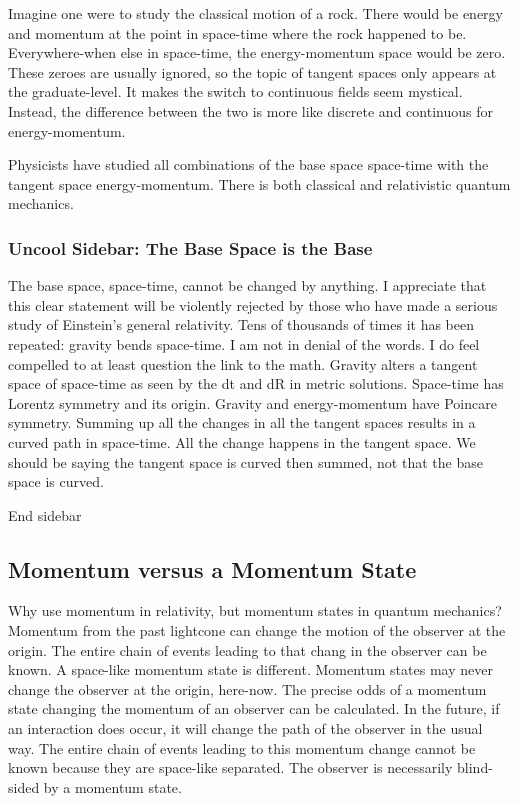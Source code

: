 Imagine one were to study the classical motion of a rock. There would be
energy and momentum at the point in space-time where the rock happened
to be. Everywhere-when else in space-time, the energy-momentum space
would be zero. These zeroes are usually ignored, so the topic of tangent
spaces only appears at the graduate-level. It makes the switch to
continuous fields seem mystical. Instead, the difference between the two
is more like discrete and continuous for energy-momentum.

Physicists have studied all combinations of the base space space-time
with the tangent space energy-momentum. There is both classical and
relativistic quantum mechanics.

\hypertarget{uncool-sidebar-the-base-space-is-the-base}{%
\subsubsection{Uncool Sidebar: The Base Space is the
Base}\label{uncool-sidebar-the-base-space-is-the-base}}

The base space, space-time, cannot be changed by anything. I appreciate
that this clear statement will be violently rejected by those who have
made a serious study of Einstein's general relativity. Tens of thousands
of times it has been repeated: gravity bends space-time. I am not in
denial of the words. I do feel compelled to at least question the link
to the math. Gravity alters a tangent space of space-time as seen by the
dt and dR in metric solutions. Space-time has Lorentz symmetry and its
origin. Gravity and energy-momentum have Poincare symmetry. Summing up
all the changes in all the tangent spaces results in a curved path in
space-time. All the change happens in the tangent space. We should be
saying the tangent space is curved then summed, not that the base space
is curved.

End sidebar

\hypertarget{momentum-versus-a-momentum-state}{%
\subsection{Momentum versus a Momentum
State}\label{momentum-versus-a-momentum-state}}

Why use momentum in relativity, but momentum states in quantum
mechanics? Momentum from the past lightcone can change the motion of the
observer at the origin. The entire chain of events leading to that chang
in the observer can be known. A space-like momentum state is different.
Momentum states may never change the observer at the origin, here-now.
The precise odds of a momentum state changing the momentum of an
observer can be calculated. In the future, if an interaction does occur,
it will change the path of the observer in the usual way. The entire
chain of events leading to this momentum change cannot be known because
they are space-like separated. The observer is necessarily blind-sided
by a momentum state.

